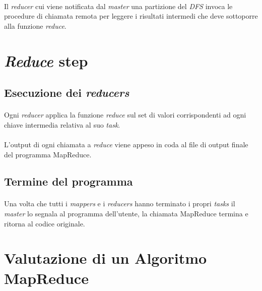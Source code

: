 \documentclass[a4paper,11pt]{report}
\begin{document}
\paragraph{}
Il \emph{reducer} cui viene notificata dal \emph{master} una partizione del \emph{DFS} invoca le procedure di chiamata remota per leggere i
risultati intermedi che
deve sottoporre alla funzione \emph{reduce}.
\section{\emph{Reduce} step}
\subsection{Esecuzione dei \emph{reducers}}
\paragraph{}
Ogni \emph{reducer} applica la funzione \emph{reduce} sul set di valori corrispondenti ad ogni chiave intermedia relativa al suo
\emph{task}.
\paragraph{}
L'output di ogni chiamata a \emph{reduce} viene appeso in coda al file di output finale del programma MapReduce.

\subsection{Termine del programma}
\paragraph{}
Una volta che tutti i \emph{mappers} e i \emph{reducers} hanno terminato i propri \emph{tasks} il \emph{master} lo segnala al programma
dell'utente,
la chiamata MapReduce termina e ritorna al codice originale.

\section{Valutazione di un Algoritmo MapReduce}
\end{document}
